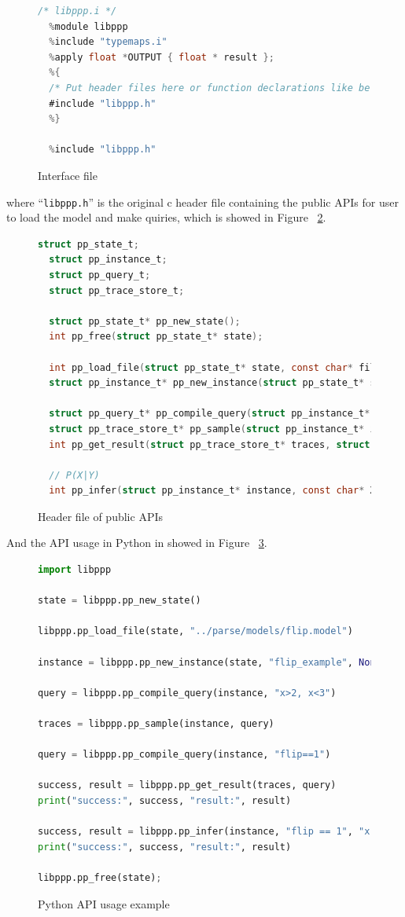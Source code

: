 \begin{figure}[h]
\begin{lstlisting}[language=C]
  /* libppp.i */
  %module libppp
  %include "typemaps.i"
  %apply float *OUTPUT { float * result };
  %{
  /* Put header files here or function declarations like below */
  #include "libppp.h"
  %}

  %include "libppp.h"
\end{lstlisting}
\caption{Interface file}
\label{fig:ifile}
\end{figure}
where ``\texttt{libppp.h}'' is the original c header file containing the public APIs for user to load the model and make quiries, which is showed in Figure ~\ref{fig:libppp}.

\begin{figure}[h]
\begin{lstlisting}[language=C]
  struct pp_state_t;
  struct pp_instance_t;
  struct pp_query_t;
  struct pp_trace_store_t;
 
  struct pp_state_t* pp_new_state();
  int pp_free(struct pp_state_t* state);
 
  int pp_load_file(struct pp_state_t* state, const char* filename);
  struct pp_instance_t* pp_new_instance(struct pp_state_t* state, const char* model_name, int* model_params);
 
  struct pp_query_t* pp_compile_query(struct pp_instance_t* instance, const char* query_string);
  struct pp_trace_store_t* pp_sample(struct pp_instance_t* instance, struct pp_query_t* query);
  int pp_get_result(struct pp_trace_store_t* traces, struct pp_query_t* query, float* result);
 
  // P(X|Y)
  int pp_infer(struct pp_instance_t* instance, const char* X, const char* Y, float* result);
\end{lstlisting}
\caption{Header file of public APIs}
\label{fig:libppp}
\end{figure}

And the API usage in Python in showed in Figure ~\ref{fig:python}.

\begin{figure}
\begin{lstlisting}[language=Python]
import libppp

state = libppp.pp_new_state()

libppp.pp_load_file(state, "../parse/models/flip.model")

instance = libppp.pp_new_instance(state, "flip_example", None)

query = libppp.pp_compile_query(instance, "x>2, x<3")

traces = libppp.pp_sample(instance, query)

query = libppp.pp_compile_query(instance, "flip==1")

success, result = libppp.pp_get_result(traces, query)
print("success:", success, "result:", result)

success, result = libppp.pp_infer(instance, "flip == 1", "x > 2, x < 3")
print("success:", success, "result:", result)

libppp.pp_free(state); 
\end{lstlisting}
\caption{Python API usage example}
\label{fig:python}
\end{figure}

